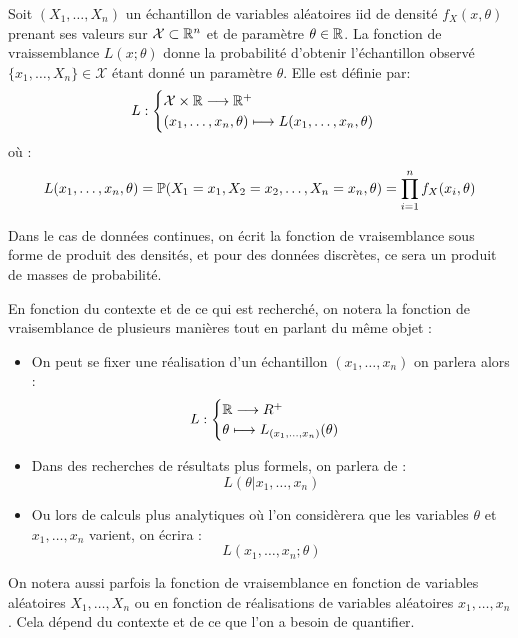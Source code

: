 \begin{definition}
    Soit $(X_1, \dots, X_n)$ un échantillon de variables aléatoires iid de densité $f_X(x,\theta)$ 
    prenant ses valeurs sur $ \mathcal{X} \subset \mathbb{R}^n$ et de paramètre $\theta \in \mathbb{R}$. 
    La fonction de vraissemblance $L(x;\theta)$ donne la probabilité d'obtenir l'échantillon observé $\{x_1, \dots, X_n\} \in \mathcal{X}$
    étant donné un paramètre $\theta$. Elle est définie par: 
        \[ L : 
            \begin{cases}
                \mathcal{X} \times \mathbb{R} \longrightarrow \mathbb{R}^+ \\ 
                (x_1, \dots, x_n, \theta) \longmapsto L(x_1, \dots, x_n, \theta) 
            \end{cases} \] 
    où :
        \[ L(x_1, \dots, x_n, \theta) = \mathbb{P}(X_1 = x_1, X_2 = x_2, \dots, X_n = x_n, \theta) = \prod_{i=1}^{n} f_X(x_i, \theta) \] 

    Dans le cas de données continues, on écrit la fonction de vraisemblance sous forme de produit des densités, 
    et pour des données discrètes, ce sera un produit de masses de probabilité. 
\end{definition}

\begin{remark}[Notations]
    En fonction du contexte et de ce qui est recherché, on notera la fonction de vraisemblance de plusieurs manières 
    tout en parlant du même objet :
    \begin{itemize}
        \item On peut se fixer une réalisation d'un échantillon $(x_1, \dots, x_n)$ on parlera alors : 
            \[ L : 
                \begin{cases}
                    \mathbb{R} \longrightarrow R^+ \\ 
                    \theta \longmapsto L_{(x_1, \dots, x_n)}(\theta)
                \end{cases}
            \] 
        \item Dans des recherches de résultats plus formels, on parlera de :
                \[ L(\theta | x_1, \dots, x_n) \] 
        \item Ou lors de calculs plus analytiques où l'on considèrera que les variables $\theta$ et $x_1, \dots, x_n$ 
        varient, on écrira :
                \[ L(x_1, \dots, x_n; \theta) \] 
    \end{itemize}
    On notera aussi parfois la fonction de vraisemblance en fonction de variables aléatoires $X_1, \dots, X_n$ ou en 
    fonction de réalisations de variables aléatoires $x_1, \dots, x_n$. 
    Cela dépend du contexte et de ce que l'on a besoin de quantifier. 
\end{remark}

